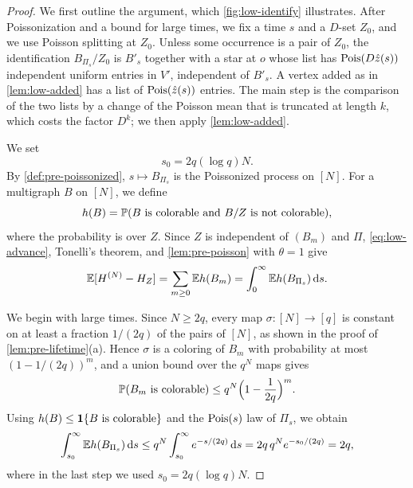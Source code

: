 \begin{proof}
We first outline the argument, which \cref{fig:low-identify} illustrates. After Poissonization and a bound for large times, we fix a time $s$ and a $D$-set $Z_0$, and we use Poisson splitting at $Z_0$. Unless some occurrence is a pair of $Z_0$, the identification $B_{\Pi_s}/Z_0$ is $B'_s$ together with a star at $o$ whose list has $\operatorname{Pois}(D \hat z(s))$ independent uniform entries in $V'$, independent of $B'_s$. A vertex added as in \cref{lem:low-added} has a list of $\operatorname{Pois}(\hat z(s))$ entries. The main step is the comparison of the two lists by a change of the Poisson mean that is truncated at length $k$, which costs the factor $D^k$; we then apply \cref{lem:low-added}.

We set
\begin{equation}\label{eq:low-prop-params}
s_0 = 2q (\log q) N.
\end{equation}
By \cref{def:pre-poissonized}, $s \mapsto B_{\Pi_s}$ is the Poissonized process on $[N]$. For a multigraph $B$ on $[N]$, we define
\begin{equation*}
h(B) = \mathbb P(B \text{ is colorable and } B/Z \text{ is not colorable}),
\end{equation*}
where the probability is over $Z$. Since $Z$ is independent of $(B_m)$ and $\Pi$, \eqref{eq:low-advance}, Tonelli's theorem, and \cref{lem:pre-poisson} with $\theta = 1$ give
\begin{equation}\label{eq:low-integral}
\mathbb E[H^{(N)} - H_Z] = \sum_{m \ge 0} \mathbb E h(B_m) = \int_0^\infty \mathbb E h(B_{\Pi_s}) \,\mathrm d s.
\end{equation}

We begin with large times. Since $N \ge 2q$, every map $\sigma \colon [N] \to [q]$ is constant on at least a fraction $1/(2q)$ of the pairs of $[N]$, as shown in the proof of \cref{lem:pre-lifetime}(a). Hence $\sigma$ is a coloring of $B_m$ with probability at most $(1 - 1/(2q))^m$, and a union bound over the $q^N$ maps gives
\begin{equation*}
\mathbb P(B_m \text{ is colorable}) \le q^N \Bigl(1 - \frac{1}{2q}\Bigr)^m.
\end{equation*}
Using $h(B) \le \mathbf 1\{B \text{ is colorable}\}$ and the $\operatorname{Pois}(s)$ law of $\Pi_s$, we obtain
\begin{equation}\label{eq:low-large}
\int_{s_0}^\infty \mathbb E h(B_{\Pi_s}) \,\mathrm d s \le q^N \int_{s_0}^\infty e^{-s/(2q)} \,\mathrm d s = 2q \, q^N e^{-s_0/(2q)} = 2q,
\end{equation}
where in the last step we used $s_0 = 2q (\log q) N$.


\end{proof}
